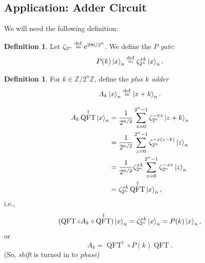 \documentclass[12pt]{amsart}
\theoremstyle{plain}
\theoremstyle{definition}
\newtheorem{definition}[theorem]{Definition}
\theoremstyle{remarks}
\newcommand{\Z}{\mathbb{Z}}
\newcommand{\me}{\mathrm{e}}
\newcommand{\mi}{\mathrm{i}}
\newcommand{\mpi}{\uppi}
\newcommand{\idef}{\overset{{\rm def}}{=}}
\newcommand{\adj}[1]{#1^{\dagger}}  %
\DeclareMathOperator{\qft}{QFT}  %
\begin{document}
\subsection{Application: Adder Circuit}

We will need the following definition:

\begin{definition}
  Let $\zeta_{2^n} \idef \me^{2 \mpi \mi/2^n}$.  We define the \emph{$P$ gate}:
  \[
    P(k) \ket{x}_n \idef \zeta_{2^n}^{xk} \ket{x}_n.
  \]
\end{definition}


\begin{definition}
  For $k \in \Z/{2^n}\Z$, define the \emph{plus $k$ adder}
  \[
    A_k \ket{x}_n \idef \ket{x + k}_n.
  \]
\end{definition}


\begin{align*}
  A_k \adj{\qft} \ket{x}_n
  &= \frac{1}{2^{n/2}} \sum_{z=0}^{2^n - 1} \zeta_{2^n}^{-xz} \ket{z + k}_n \\
  &= \frac{1}{2^{n/2}} \sum_{z=0}^{2^n - 1} \zeta_{2^n}^{-x(z-k)} \ket{z}_n \\
  &= \frac{1}{2^{n/2}} \zeta_{2^n}^{xk }\sum_{z=0}^{2^n - 1} \zeta_{2^n}^{-xz} \ket{z}_n \\
  &= \zeta_{2^n}^{xk} \adj{\qft} \ket{x}_n,
\end{align*}
i.e.,
\begin{equation}
  \label{eq:qftak}
  (\qft \circ A_k \circ \adj{\qft}) \ket{x}_n = \zeta_{2^n}^{xk} \ket{x}_n = P(k) \ket{x}_n,
\end{equation}
or
\begin{equation}\label{eq:ak}
  A_k = \adj{\qft} \circ P(k) \qft.
\end{equation}
(So, \emph{shift} is turned in to \emph{phase})
\end{document}
